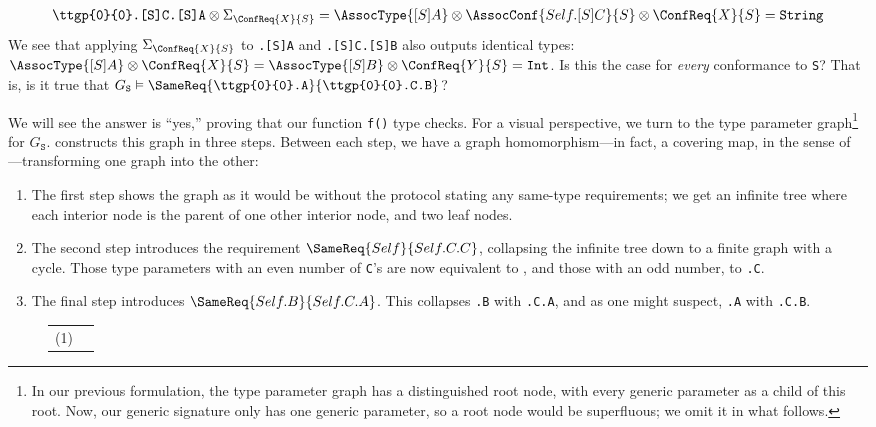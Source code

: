 \documentclass[../generics]{subfiles}
\begin{document}
\begin{example}
\begin{gather*}
\texttt{\ttgp{0}{0}.[S]C.[S]A}\otimes\Sigma_{\ConfReq{X}{S}}=\AssocType{[S]A}\otimes\AssocConf{Self.[S]C}{S}\otimes\ConfReq{X}{S}=\texttt{String}
\end{gather*}
We see that applying $\Sigma_{\ConfReq{X}{S}}$ to \texttt{.[S]A} and \texttt{.[S]C.[S]B} also outputs identical types: $\AssocType{[S]A}\otimes\ConfReq{X}{S}=\AssocType{[S]B}\otimes\ConfReq{Y}{S}=\texttt{Int}$. Is this the case for \emph{every} conformance to \texttt{S}? That is, is it true that $G_\texttt{S}\vDash\SameReq{\texttt{\ttgp{0}{0}.A}}{\texttt{\ttgp{0}{0}.C.B}}$?

We will see the answer is ``yes,'' proving that our function \texttt{f()} type checks. For a visual perspective, we turn to the type parameter graph\footnote{In our previous formulation, the type parameter graph has a distinguished root node, with every generic parameter as a child of this root. Now, our generic signature only has one generic parameter, so a root node would be superfluous; we omit it in what follows.} for $G_\texttt{S}$.  constructs this graph in three steps. Between each step, we have a graph homomorphism---in fact, a covering map, in the sense of ---transforming one graph into the other:
\begin{enumerate}
\item The first step shows the graph as it would be without the protocol stating any same-type requirements; we get an infinite tree where each interior node is the parent of one other interior node, and two leaf nodes.

\item The second step introduces the requirement $\SameReq{Self}{Self.C.C}$, collapsing the infinite tree down to a finite graph with a cycle. Those type parameters with an even number of \texttt{C}'s are now equivalent to \texttt{}, and those with an odd number, to \texttt{.C}.

\item The final step introduces $\SameReq{Self.B}{Self.C.A}$. This collapses \texttt{.B} with \texttt{.C.A}, and as one might suspect, \texttt{.A} with \texttt{.C.B}.
\end{enumerate}

\begin{figure}\label{protocol s fig}
\begin{center}
\begin{tabular}{lc}
\toprule
(1) &
\begin{tikzpicture}


\end{tikzpicture}
\end{tabular}
\end{center}
\end{figure}
\end{example}
\end{document}

